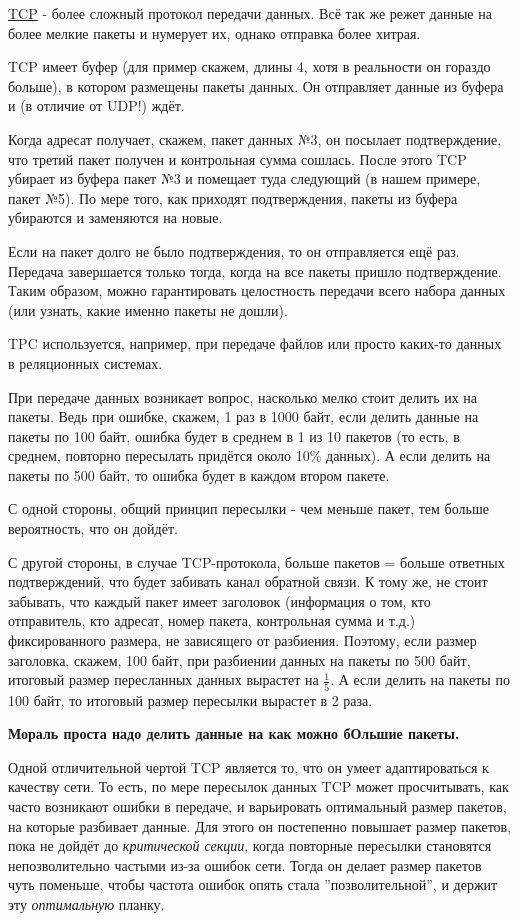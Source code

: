 \href{https://ru.wikipedia.org/wiki/Transmission_Control_Protocol}{TCP} - более сложный протокол передачи данных. Всё так же режет данные на более мелкие пакеты и нумерует их, однако отправка более хитрая.

TCP имеет буфер (для пример скажем, длины 4, хотя в реальности он гораздо больше), в котором размещены пакеты данных. Он отправляет данные из буфера и (в отличие от UDP!) ждёт.

Когда адресат получает, скажем, пакет данных №3, он посылает подтверждение, что третий пакет получен и контрольная сумма сошлась. После этого TCP убирает из буфера пакет №3 и помещает туда следующий (в нашем примере, пакет №5). По мере того, как приходят подтверждения, пакеты из буфера убираются и заменяются на новые.

Если на пакет долго не было подтверждения, то он отправляется ещё раз. Передача завершается только тогда, когда на все пакеты пришло подтверждение. Таким образом, можно гарантировать целостность передачи всего набора данных (или узнать, какие именно пакеты не дошли).

TPC используется, например, при передаче файлов или просто каких-то данных в реляционных системах.

\bigskip
При передаче данных возникает вопрос, насколько мелко стоит делить их на пакеты. Ведь при ошибке, скажем, 1 раз в 1000 байт, если делить данные на пакеты по 100 байт, ошибка будет в среднем в 1 из 10 пакетов (то есть, в среднем, повторно пересылать придётся около 10\% данных). А если делить на пакеты по 500 байт, то ошибка будет в каждом втором пакете.

С одной стороны, общий принцип пересылки - чем меньше пакет, тем больше вероятность, что он дойдёт. 

С другой стороны, в случае TCP-протокола, больше пакетов = больше ответных подтверждений, что будет забивать канал обратной связи. К тому же, не стоит забывать, что каждый пакет имеет заголовок (информация о том, кто отправитель, кто адресат, номер пакета, контрольная сумма и т.д.) фиксированного размера, не зависящего от разбиения. Поэтому, если размер заголовка, скажем, 100 байт, при разбиении данных на пакеты по 500 байт, итоговый размер пересланных данных вырастет на $\frac{1}{5}$. А если делить на пакеты по 100 байт, то итоговый размер пересылки вырастет в 2 раза.

\textbf{Мораль проста надо делить данные на как можно бОльшие пакеты.}

Одной отличительной чертой TCP является то, что он умеет адаптироваться к качеству сети. То есть, по мере пересылок данных TCP может просчитывать, как часто возникают ошибки в передаче, и варьировать оптимальный размер пакетов, на которые разбивает данные. Для этого он постепенно повышает размер пакетов, пока не дойдёт до \textit{критической секции}, когда повторные пересылки становятся непозволительно частыми из-за ошибок сети. Тогда он делает размер пакетов чуть поменьше, чтобы частота ошибок опять стала ''позволительной'', и держит эту \textit{оптимальную} планку.

